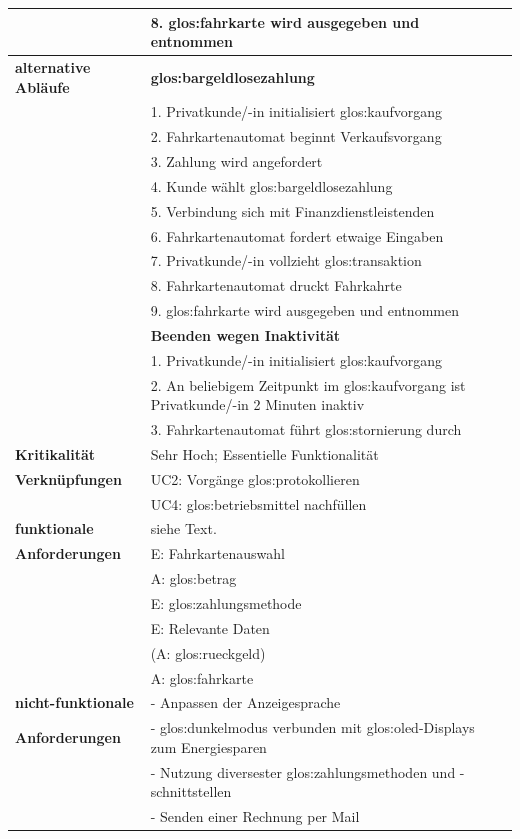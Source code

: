 \documentclass{lastenheft}
\begin{document}
\begin{xltabular}{\linewidth}{|>{\bfseries}p{4cm}|X|}
    & 8. \gls{glos:fahrkarte} wird ausgegeben und entnommen \\
    \hline
    alternative Abläufe & \textbf{\gls{glos:bargeldlosezahlung}} \\
    & 1. Privatkunde/-in initialisiert \gls{glos:kaufvorgang} \\
    & 2. Fahrkartenautomat beginnt Verkaufsvorgang \\
    & 3. Zahlung wird angefordert \\
    & 4. Kunde wählt \gls{glos:bargeldlosezahlung} \\
    & 5. Verbindung sich mit Finanzdienstleistenden \\
    & 6. Fahrkartenautomat fordert etwaige Eingaben \\
    & 7. Privatkunde/-in vollzieht \gls{glos:transaktion} \\
    & 8. Fahrkartenautomat druckt Fahrkahrte \\
    & 9. \gls{glos:fahrkarte} wird ausgegeben und entnommen \\
    & \textbf{Beenden wegen Inaktivität} \\
    & 1. Privatkunde/-in initialisiert  \gls{glos:kaufvorgang} \\
    & 2. An beliebigem Zeitpunkt im \gls{glos:kaufvorgang} ist Privatkunde/-in 2 Minuten inaktiv \\
    & 3. Fahrkartenautomat führt \gls{glos:stornierung} durch \\
    \hline
    Kritikalität & Sehr Hoch; Essentielle Funktionalität\\
    \hline
    Verknüpfungen & UC2: Vorgänge \gls{glos:protokollieren} \\
    & UC4: \gls{glos:betriebsmittel} nachfüllen \\
    \hline
    funktionale & siehe Text.\\
    Anforderungen & E: Fahrkartenauswahl \\
    & A: \gls{glos:betrag} \\
    & E: \gls{glos:zahlungsmethode} \\
    & E: Relevante Daten \\
    & (A: \gls{glos:rueckgeld}) \\
    & A: \gls{glos:fahrkarte} \\
    \hline
    nicht-funktionale & - Anpassen der Anzeigesprache \\
    Anforderungen & - \gls{glos:dunkelmodus} verbunden mit \gls{glos:oled}-Displays zum Energiesparen \\
    & - Nutzung diversester \gls{glos:zahlungsmethode}n und -schnittstellen \\
    & - Senden einer Rechnung per Mail \\
    \hline
\end{xltabular}
\end{document}

